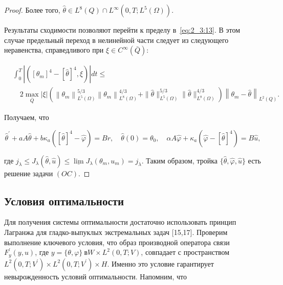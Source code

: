 \begin{proof}
    Более того, $\widehat{\theta} \in L^{8}(Q)
    \cap L^{\infty}\left(0, T ; L^{5}(\Omega)\right)$.

    Результаты сходимости позволяют перейти к пределу в~\eqref{eq:2_3:13}.
    В этом случае предельный переход в
    нелинейной части следует из следующего неравенства,
    справедливого при $\xi \in C^{\infty}(\bar{Q})$:

    \[
        \begin{aligned}
            & \int_{0}^{T}\left|\left(\left[\theta_{m}\right]^{4}
            -[\widehat{\theta}]^{4}, \xi\right)\right| d t \leq \\
            & \quad 2 \max _{\bar{Q}}|\xi|
            \left(\left\|\theta_{m}\right\|_{L^{5}(\Omega)}^{5 / 3}\left\|
            \theta_{m}\right\|_{L^{8}(\Omega)}^{4 / 3}
            + \|\widehat{\theta}\|_{L^{5}(\Omega)}^{5 / 3}
            \|\widehat{\theta}\|_{L^{8}(\Omega)}^{4 / 3}\right)\left\|\theta_{m}
            - \widehat{\theta}\right\|_{L^{2}(Q)}.
        \end{aligned}
    \]


    Получаем, что

    \[
        \widehat{\theta}^{\prime}+a A \widehat{\theta}+b
        \kappa_{a}\left([\widehat{\theta}]^{4}-\widehat{\varphi}\right)=B r,
        \quad \widehat{\theta}(0)=\theta_{0},
        \quad \alpha A \widehat{\varphi}+\kappa_{a}\left(\widehat{\varphi}-
        [\widehat{\theta}]^{4}\right)=B \widehat{u},
    \]

    где $j_{\lambda} \leq J_{\lambda}(\widehat{\theta},
    \widehat{u}) \leq \underline{\lim }
    J_{\lambda}\left(\theta_{m}, u_{m}\right)=j_{\lambda}$.
    Таким образом, тройка $\{\widehat{\theta}, \widehat{\varphi}, \widehat{u}\}$
    есть решение задачи $(OC)$.
\end{proof}

\subsection{Условия оптимальности}\label{subsec:ch2/sec3/subsec4}
Для получения системы оптимальности достаточно использовать принцип Лагранжа
для гладко-выпуклых экстремальных задач [15,17].
Проверим выполнение ключевого условия,
что образ производной оператора связи $F_{y}^{\prime}(y, u)$,
где $y=\{\theta, \varphi\} \ в W \times L^{2}(0, T ; V)$,
совпадает с пространством
$L^{2}\left(0, T; V^{\prime}\right) \times L^{2} \left(0, T ; V^{\prime}\right) \times H$.
Именно это условие гарантирует невырожденность условий оптимальности.
Напомним, что

